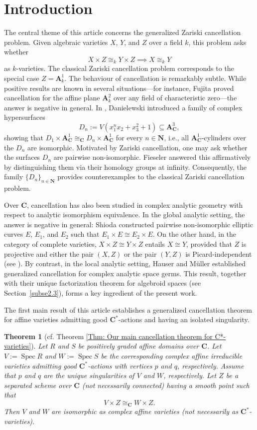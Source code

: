 \documentclass[english,10pt,reqno,twoside]{amsart}
\numberwithin{equation}{section}
\numberwithin{figure}{section}
\theoremstyle{plain}
\theoremstyle{plain}
\theoremstyle{definition}
\theoremstyle{plain}
\newtheorem{mainthm}{Theorem}
\numberwithin{equation}{section}
\newcommand{\A}{\mathbf{A}}
\newcommand{\C}{\mathbf{C}}
\newcommand{\N}{\mathbf{N}}
\newcommand{\Spec}{\operatorname{Spec}}
\begin{document}
\section{\bf Introduction}\label{se1}
The central theme of this article concerns the generalized Zariski cancellation problem. Given algebraic varieties $X$, $Y$, and $Z$ over a field $k$, this problem asks whether
\[
X\times Z \cong_k Y\times Z
\implies
X\cong_k Y
\]
as $k$-varieties. The classical Zariski cancellation problem corresponds to the special case $Z=\A^1_k$. The behaviour of cancellation is remarkably subtle. While positive results are known in several situations---for instance, Fujita \cite{Fuj1979} proved cancellation for the affine plane $\A^2_k$ over any field of characteristic zero---the answer is negative in general. In \cite{Dan1989}, Danielewski introduced a family of complex hypersurfaces
\[
D_n:=V(x_1^n x_2+x_3^2+1)\subseteq \A^3_\C,
\]
showing that $D_1\times\A^1_\C\cong_\C D_n\times\A^1_\C$ for every $n\in\N$, i.e., all $\A^1_\C$-cylinders over the $D_n$ are isomorphic. Motivated by Zariski cancellation, one may ask whether the surfaces $D_n$ are pairwise non-isomorphic. Fieseler \cite{Fie1994} answered this affirmatively by distinguishing them via their homology groups at infinity. Consequently, the family $\{D_n\}_{n\in\N}$ provides counterexamples to the classical Zariski cancellation problem.


Over $\C$, cancellation has also been studied in complex analytic geometry with respect to analytic isomorphism equivalence. In the global analytic setting, the answer is negative in general: Shioda \cite{Shi1977} constructed pairwise non-isomorphic elliptic curves $E$, $E_1$, and $E_2$ such that $E_1\times E\cong E_2\times E$. On the other hand, in the category of complete varieties, $X\times Z\cong Y\times Z$ entails $X\cong Y$, provided that $Z$ is projective and either the pair $(X,Z)$ or the pair $(Y,Z)$ is Picard-independent (see \cite{Fuj1981}). By contrast, in the local analytic setting, Hauser and M\"uller \cite[Theorem~1]{HM1990} established generalized cancellation for complex analytic space germs. This result, together with their unique factorization theorem for algebroid spaces (see Section~\ref{subse2.3}), forms a key ingredient of the present work.

The first main result of this article establishes a generalized cancellation theorem for affine varieties admitting good
$\C^*$-actions and having an isolated singularity.

\begin{mainthm}[{cf. Theorem \ref{Thm: Our main cancellation theorem for C*-varieties}}]\label{thm:mainA}
Let $R$ and $S$ be positively graded affine domains over $\C$. Let $V:=\Spec R$ and $W:=\Spec S$ be the corresponding complex affine irreducible varieties admitting good $\C^*$-actions with vertices $p$ and $q$, respectively. Assume that $p$ and $q$ are the unique singularities of $V$ and $W$, respectively. Let $Z$ be a separated scheme over $\C$ (not necessarily connected) having a smooth point such that
\[
V\times Z \cong_{\C} W\times Z.
\]
Then $V$ and $W$ are isomorphic as complex affine varieties (not necessarily as $\C^*$-varieties).
\end{mainthm}
\end{document}
